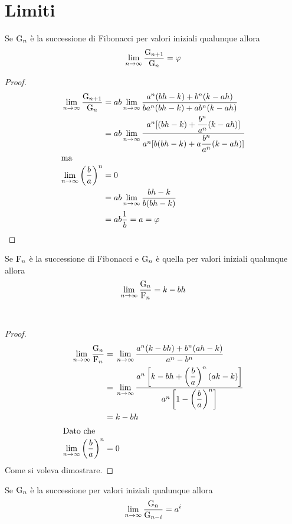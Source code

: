 \section{Limiti}
\begin{thm}
	Se $\mathrm{G}_{n}$ è la successione di Fibonacci per valori iniziali qualunque 
	allora 
	\begin{equation}
		\lim_{n\to\infty}\dfrac{\mathrm{G}_{n+1}}{\mathrm{G}_{n}}=\varphi
	\end{equation}\label{eqn:FibLimRapGen}
\end{thm}
\begin{proof}
	\begin{align*}
		\lim_{n\to\infty}\dfrac{\mathrm{G}_{n+1}}{\mathrm{G}_{n}}={}&ab\lim_{n\to\infty}\dfrac{a^n(bh-k)+b^n(k-ah)}{ba^n(bh-k)+ab^n(k-ah)}\\
		={}&ab\lim_{n\to\infty}\dfrac{a^n[(bh-k)+\dfrac{b^n}{a^n}(k-ah)]}{a^n[b(bh-k)+a\dfrac{b^n}{a^n}(k-ah)]}\\
		\intertext{ma}
	\lim_{n\to\infty}\left(\dfrac{b}{a}\right)^n={}&0\\
={}&ab\lim_{n\to\infty}\dfrac{bh-k}{b(bh-k)}\\
={}&ab\dfrac{1}{b}=a=\varphi\\
 	\end{align*}
 \end{proof}
\begin{thm}
	Se $\mathrm{F}_{n}$ è la successione di Fibonacci e $\mathrm{G}_{n}$ è quella per valori 
	iniziali qualunque allora 
	\begin{equation}
		\lim_{n\to\infty}\dfrac{\mathrm{G}_{n}}{\mathrm{F}_{n}}=k-bh
	\end{equation}\label{eqn:FibLimFibGib}
\end{thm}~\cite{Horadam_1961}
\begin{proof}
	\begin{align*}
		\lim_{n\to\infty}\dfrac{\mathrm{G}_{n}}{\mathrm{F}_{n}}={}&\lim_{n\to\infty}\dfrac{a^n(k-bh)+b^n(ah-k)}{a^n-b^n}\\
		={}&\lim_{n\to\infty}\dfrac{a^n\left[k-bh+\left(\dfrac{b}{a}\right)^n(ak-k)\right]}{a^n\left[1-\left(\dfrac{b}{a}\right)^n\right]}\\
		={}&k-bh\\
		\intertext{Dato che}
		\lim_{n\to\infty}\left(\dfrac{b}{a}\right)^{n}={}&0\\
	\end{align*}
	Come si voleva dimostrare.
\end{proof}
\begin{thm}
	Se  $\mathrm{G}_{n}$ è la successione per valori iniziali qualunque allora 
	\begin{equation}
		\lim_{n\to\infty}\dfrac{\mathrm{G}_{n}}{\mathrm{G}_{n-i}}=a^i
	\end{equation}\label{eqn:GibLimdif}
\end{thm}~\cite{Horadam_1961}

